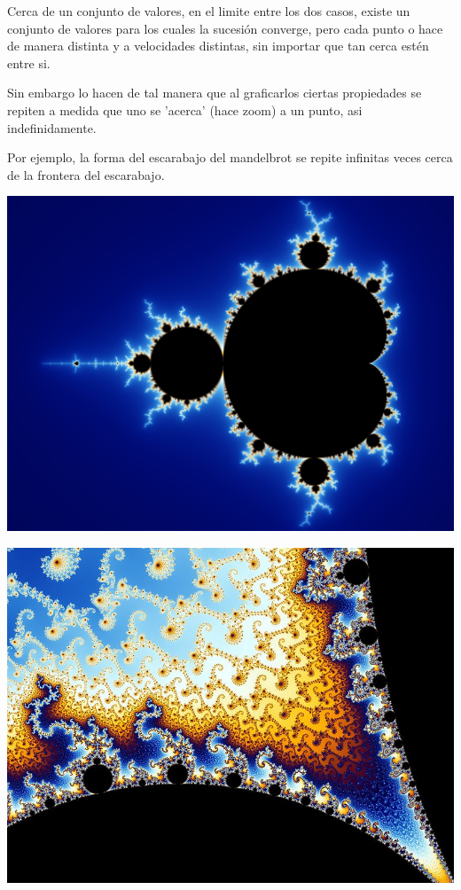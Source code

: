 \documentclass[a4paper,11pt,spanish,sans]{exam}
\begin{document}
\begin{itemize}
Cerca de un conjunto de  valores, en el limite entre los dos casos, existe un conjunto de valores para los cuales la sucesión converge, pero cada punto o hace de manera distinta y a velocidades distintas, sin importar que tan cerca estén entre si.

Sin embargo lo hacen de tal manera que al graficarlos ciertas propiedades se repiten a medida que uno se 'acerca' (hace zoom) a un punto, asi indefinidamente.

Por ejemplo, la forma del escarabajo del mandelbrot se repite infinitas veces cerca de la frontera del escarabajo.

 

	
\begin{minipage}{0.5\textwidth}

\centering
\includegraphics[width= 0.7\linewidth]{mandel00.jpg}
\label{fig:univerise}

\end{minipage}
\begin{minipage}{0.5\textwidth}

\centering
\includegraphics[width= 0.7\linewidth]{mandel1.jpg}
\label{fig:erise}


\end{minipage}
\end{itemize}
\end{document}
